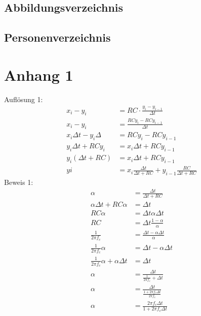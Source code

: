 \documentclass[12pt,a4paper, ngerman]{article}
\begin{document}
\subsection{Abbildungsverzeichnis}
\listoffigures
\subsection{Personenverzeichnis}
\newpage
\section{Anhang 1}
Auflösung 1:
\begin{align*} 
x_{i}-y_{i}&=RC\cdot \frac{y_{i}-y_{i-1}}{\Delta t} \\ 
x_{i}-y_{i}&=\frac{RCy_{i}-RCy_{i-1}}{\Delta t}\\
x_{i}\Delta t-y_{i}\Delta&=RCy_{i}-RCy_{i-1} \\
y_{i}\Delta t+RCy_{i}&=x_{i}\Delta t+RCy_{i-1} \\
y_{i}(\Delta t+RC)&=x_{i}\Delta t+RCy_{i-1} \\
y{i}&=x_{i}\frac{\Delta t}{\Delta t+RC} + y_{i-1}\frac{RC}{\Delta t+RC}
\end{align*}
Beweis 1:
\begin{align*}
\alpha&=\frac{\Delta t}{\Delta t+RC} \\
\alpha \Delta t+RC\alpha &= \Delta t \\
RC\alpha &= \Delta t \alpha \Delta t \\
RC &= \Delta t \frac{1-\alpha}{\alpha}\\
\frac{1}{2\pi f_{c}} &= \frac{\Delta t -\alpha\Delta t}{\alpha} \\
\frac{1}{2\pi f_{c}} \alpha &= \Delta t -\alpha\Delta t \\
\frac{1}{2\pi f_{c}} \alpha + \alpha\Delta t &= \Delta t \\
\alpha &= \frac{\Delta t}{\frac{1}{2\pi f_{c}} + \Delta t} \\
\alpha &= \frac{\Delta t}{\frac{1+2\pi f_{c}\Delta t}{2\pi f_{c}}} \\
\alpha &= \frac{2\pi f_{c}\Delta t}{1+2\pi f_{c}\Delta t} 
\end{align*}
\end{document}
